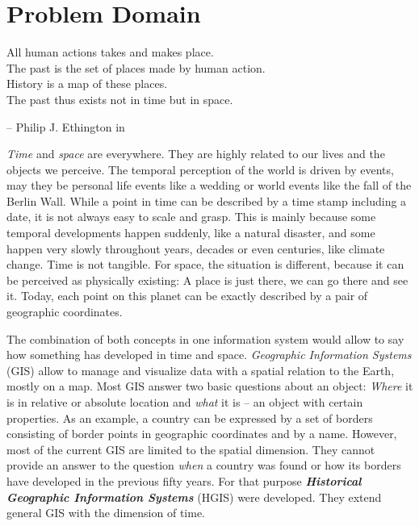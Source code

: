 
\section{Problem Domain} %
\label{sec:problem_domain}

\begin{quoteit}
  All human actions takes and makes place. \\
  The past is the set of places made by human action. \\
  History is a map of these places. \\
  The past thus exists not in time but in space.
\end{quoteit}
\hfill -- Philip J. Ethington in \cite[précis]{citeTakeMakePlace}

\emph{Time} and \emph{space} are everywhere. They are highly related to our lives and the objects we perceive. The temporal perception of the world is driven by events, may they be personal life events like a wedding or world events like the fall of the Berlin Wall. While a point in time can be described by a time stamp including a date, it is not always easy to scale and grasp. This is mainly because some temporal developments happen suddenly, like a natural disaster, and some happen very slowly throughout years, decades or even centuries, like climate change. Time is not tangible. For space, the situation is different, because it can be perceived as physically existing: A place is just there, we can go there and see it. Today, each point on this planet can be exactly described by a pair of geographic coordinates.

The combination of both concepts in one information system would allow to say how something has developed in time and space. \emph{Geographic Information Systems} (GIS) allow to manage and visualize data with a spatial relation to the Earth, mostly on a map. Most GIS answer two basic questions about an object: \emph{Where} it is in relative or absolute location and \emph{what} it is -- an object with certain properties. As an example, a country can be expressed by a set of borders consisting of border points in geographic coordinates and by a name. However, most of the current GIS are limited to the spatial dimension. They cannot provide an answer to the question \emph{when} a country was found or how its borders have developed in the previous fifty years. For that purpose \textbf{\emph{Historical Geographic Information Systems}} (HGIS) were developed. They extend general GIS with the dimension of time.

